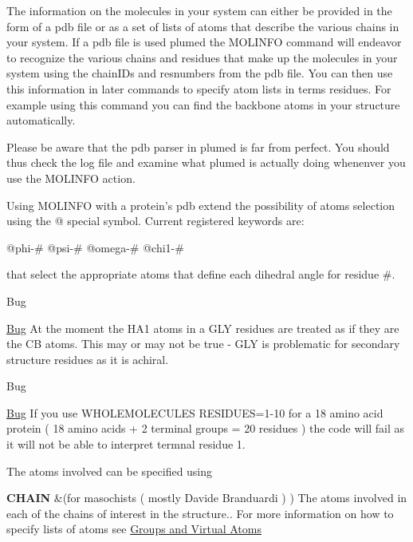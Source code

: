 The information on the molecules in your system can either be provided in the form of a pdb file or as a set of lists of atoms that describe the various chains in your system. If a pdb file is used plumed the M\+O\+L\+I\+N\+F\+O command will endeavor to recognize the various chains and residues that make up the molecules in your system using the chain\+I\+Ds and resnumbers from the pdb file. You can then use this information in later commands to specify atom lists in terms residues. For example using this command you can find the backbone atoms in your structure automatically.

Please be aware that the pdb parser in plumed is far from perfect. You should thus check the log file and examine what plumed is actually doing whenenver you use the M\+O\+L\+I\+N\+F\+O action.

Using M\+O\+L\+I\+N\+F\+O with a protein's pdb extend the possibility of atoms selection using the @ special symbol. Current registered keywords are\+:

\begin{DoxyVerb}@phi-#
@psi-#
@omega-#
@chi1-#
\end{DoxyVerb}


that select the appropriate atoms that define each dihedral angle for residue \#.

\begin{DoxyRefDesc}{Bug}
\item[\hyperlink{bug__bug000002}{Bug}]At the moment the H\+A1 atoms in a G\+L\+Y residues are treated as if they are the C\+B atoms. This may or may not be true -\/ G\+L\+Y is problematic for secondary structure residues as it is achiral. \end{DoxyRefDesc}


\begin{DoxyRefDesc}{Bug}
\item[\hyperlink{bug__bug000003}{Bug}]If you use W\+H\+O\+L\+E\+M\+O\+L\+E\+C\+U\+L\+E\+S R\+E\+S\+I\+D\+U\+E\+S=1-\/10 for a 18 amino acid protein ( 18 amino acids + 2 terminal groups = 20 residues ) the code will fail as it will not be able to interpret termnal residue 1.\end{DoxyRefDesc}


\begin{DoxyParagraph}{The atoms involved can be specified using}

\end{DoxyParagraph}
\begin{TabularC}{2}
\hline
{\bfseries  C\+H\+A\+I\+N } &(for masochists ( mostly Davide Branduardi ) ) The atoms involved in each of the chains of interest in the structure.. For more information on how to specify lists of atoms see \hyperlink{Group}{Groups and Virtual Atoms}   \\
\end{TabularC}


